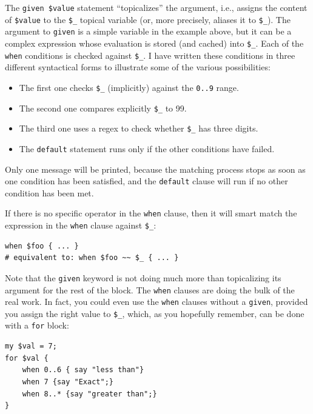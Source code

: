 The \verb'given $value' statement ``topicalizes'' the argument, 
i.e., assigns the content of  \verb'$value' to the \verb'$_' 
topical variable (or, more precisely, aliases it to \verb'$_'). 
The argument to {\tt given} is a simple variable in the 
example above, but it can be a complex expression whose 
evaluation is stored (and cached) into \verb'$_'. 
Each of the {\tt when} conditions is checked against \verb'$_'. 
I have written these conditions in three different syntactical 
forms to illustrate some of the various possibilities:
\begin{itemize}
\item The first one checks \verb'$_' (implicitly) against 
the \verb'0..9' range.
\item The second one compares explicitly \verb'$_' to 99.
\item The third one uses a regex to check whether \verb'$_' has 
three digits.
\item The \verb'default' statement runs only if the other 
conditions have failed.
\end{itemize}

Only one message will be printed, because the 
matching process stops as soon as one condition has been 
satisfied, and the \verb'default' clause will run if 
no other condition has been met.

If there is no specific operator in the {\tt when} clause, 
then it will smart match the expression in the {\tt when} 
clause against \verb'$_':

\begin{verbatim}
when $foo { ... }
# equivalent to: when $foo ~~ $_ { ... }
\end{verbatim}

Note that the {\tt given} keyword is not doing much more than 
topicalizing its argument for the rest of the block. 
The {\tt when} clauses are doing the bulk of the real work. In fact, 
you could even use the {\tt when} clauses without a {\tt given}, 
provided you assign the right value to \verb'$_', which, as you 
hopefully remember, can be done with a {\tt for} block:

\begin{verbatim}
my $val = 7;
for $val { 
    when 0..6 { say "less than"}
    when 7 {say "Exact";} 
    when 8..* {say "greater than";}
}
\end{verbatim}

